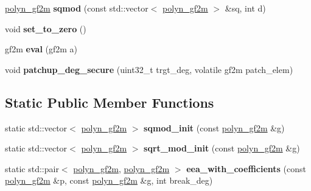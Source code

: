 \begin{DoxyCompactItemize}
\hyperlink{class_botan_1_1polyn__gf2m}{polyn\+\_\+gf2m} {\bfseries sqmod} (const std\+::vector$<$ \hyperlink{class_botan_1_1polyn__gf2m}{polyn\+\_\+gf2m} $>$ \&sq, int d)
\item 
\mbox{\label{class_botan_1_1polyn__gf2m_a097fb29709eb8794316ccd9afa879c46}} 
void {\bfseries set\+\_\+to\+\_\+zero} ()
\item 
\mbox{\label{class_botan_1_1polyn__gf2m_ae25fb2bcf872e48c4d4bca144663e0a7}} 
gf2m {\bfseries eval} (gf2m a)
\item 
\mbox{\label{class_botan_1_1polyn__gf2m_ac555338c1424697df82bc147872b4f82}} 
void {\bfseries patchup\+\_\+deg\+\_\+secure} (uint32\+\_\+t trgt\+\_\+deg, volatile gf2m patch\+\_\+elem)
\end{DoxyCompactItemize}
\subsection*{Static Public Member Functions}
\begin{DoxyCompactItemize}
\item 
\mbox{\label{class_botan_1_1polyn__gf2m_aa251ce09d8a87e85a8ba08d07c1a6f1d}} 
static std\+::vector$<$ \hyperlink{class_botan_1_1polyn__gf2m}{polyn\+\_\+gf2m} $>$ {\bfseries sqmod\+\_\+init} (const \hyperlink{class_botan_1_1polyn__gf2m}{polyn\+\_\+gf2m} \&g)
\item 
\mbox{\label{class_botan_1_1polyn__gf2m_a223f3286e266ae75e2a43d3d5fe4f764}} 
static std\+::vector$<$ \hyperlink{class_botan_1_1polyn__gf2m}{polyn\+\_\+gf2m} $>$ {\bfseries sqrt\+\_\+mod\+\_\+init} (const \hyperlink{class_botan_1_1polyn__gf2m}{polyn\+\_\+gf2m} \&g)
\item 
\mbox{\label{class_botan_1_1polyn__gf2m_a3cd8803140f5a92b85e5ed79ce981919}} 
static std\+::pair$<$ \hyperlink{class_botan_1_1polyn__gf2m}{polyn\+\_\+gf2m}, \hyperlink{class_botan_1_1polyn__gf2m}{polyn\+\_\+gf2m} $>$ {\bfseries eea\+\_\+with\+\_\+coefficients} (const \hyperlink{class_botan_1_1polyn__gf2m}{polyn\+\_\+gf2m} \&p, const \hyperlink{class_botan_1_1polyn__gf2m}{polyn\+\_\+gf2m} \&g, int break\+\_\+deg)
\end{DoxyCompactItemize}
